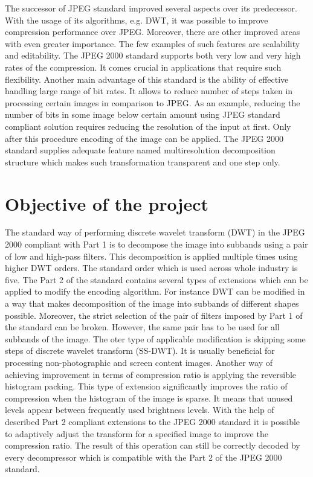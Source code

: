 The successor of JPEG standard improved several aspects over its predecessor. With the usage of its algorithms,
e.g. DWT, it was possible to improve compression performance over JPEG. Moreover, there are other improved areas
with even greater importance. The few examples of such features are scalability and editability. \cite{jpeg2000}
The JPEG 2000 standard supports both very low and very high rates of the compression. It comes crucial
in applications that require such flexibility. Another main advantage of this standard is the ability of
effective handling large range of bit rates. It allows to reduce number of steps taken in processing
certain images in comparison to JPEG. As an example, reducing the number of bits in some image below certain
amount using JPEG standard compliant solution requires reducing the resolution of the input at first.
Only after this procedure encoding of the image can be applied. The JPEG 2000 standard supplies adequate feature
named multiresolution decomposition structure which makes such transformation transparent and one step only. \cite{jpeg2000}


\section{Objective of the project}

The standard way of performing discrete wavelet transform (DWT) in the JPEG 2000 compliant with Part 1 is to decompose
the image into subbands using a pair of low and high-pass filters. This decomposition is applied multiple times using
higher DWT orders. The standard order which is used across whole industry is five. \cite{jpeg_suite} \cite{jpeg_summary}
The Part 2 of the standard contains several types of extensions which can be applied to modify the encoding
algorithm. For instance DWT can be modified in a way that makes decomposition of the image into subbands of different
shapes possible. Moreover, the strict selection of the pair of filters imposed by Part 1 of the standard can be
broken. However, the same pair has to be used for all subbands of the image. \cite{jpeg_suite} The oter type of applicable
modification is skipping some steps of discrete wavelet transform (SS-DWT). It is usually beneficial for processing
non-photographic and screen content images. Another way of achieving improvement in terms of compression ratio is
applying the reversible histogram packing. This type of extension significantly improves the ratio of compression
when the histogram of the image is sparse. It means that unused levels appear between frequently used brightness levels.
With the help of described Part 2 compliant extensions to the JPEG 2000 standard it is possible to adaptively
adjust the transform for a specified image to improve the compression ratio. The result of this operation can still
be correctly decoded by every decompressor which is compatible with the Part 2 of the JPEG 2000 standard.

